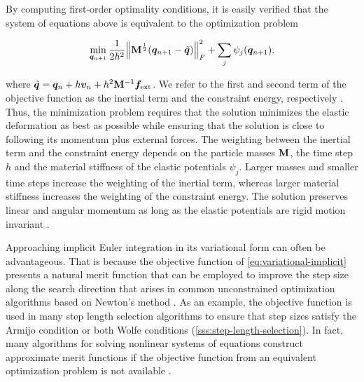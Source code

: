 \noindent By computing first-order optimality conditions, it is easily verified that the system of equations above is equivalent to the optimization 
problem

\begin{equation}\label{eq:variational-implicit}
    \min_{\bm{q}_{n+1}} \frac{1}{2h^2} \norm{\mathbf{M}^{\frac{1}{2}}(\bm{q}_{n+1} - \tilde{\bm{q}})}^2_F + \sum_j \psi_j(\bm{q}_{n+1}).
\end{equation}

\noindent where $\tilde{\bm{q}} = \bm{q}_n + h\bm{v}_n + h^2\mathbf{M}^{-1}\bm{f}_{\text{ext}}$.  
We refer to the first and second term of the objective function as the inertial term and the constraint energy, respectively \cite{bouaziz2014}. 
Thus, the minimization problem requires that the solution minimizes the elastic deformation as best as possible while ensuring that the solution is 
close to following its momentum plus external forces. The weighting between the inertial term and the constraint energy depends on the 
particle masses $\mathbf{M}$, the time step $h$ and the material stiffness of the elastic potentials $\psi_j$. Larger masses and smaller time steps 
increase the weighting of the inertial term, whereas larger material stiffness increases the weighting of the constraint energy. 
The solution preserves linear and angular momentum as long as the elastic potentials are rigid motion invariant \cite{bouaziz2014}.

Approaching implicit Euler integration in its variational form can often be advantageous. That is because the objective function of 
\autoref{eq:variational-implicit} presents a natural merit function that can be employed to improve the step size along the search direction 
that arises in common unconstrained optimization algorithms based on Newton's method \cite{nocedal2006}. As an example, the objective 
function is used in many step length selection algorithms to ensure that step sizes satisfy the Armijo condition or both Wolfe conditions 
(\cref{sss:step-length-selection}). In fact, many algorithms for solving nonlinear systems of equations construct approximate merit functions 
if the objective function from an equivalent optimization problem is not available \cite{nocedal2006}.


